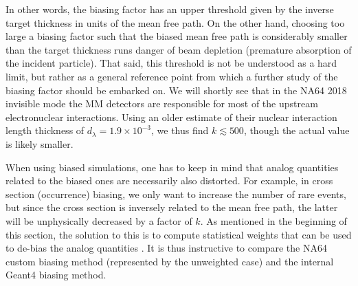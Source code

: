 %
In other words, the biasing factor has an upper threshold given by the inverse target thickness in units of the mean free path. On the other hand, choosing too large a biasing factor such that the biased mean free path is considerably smaller than the target thickness runs danger of beam depletion (premature absorption of the incident particle). That said, this threshold is not be understood as a hard limit, but rather as a general reference point from which a further study of the biasing factor should be embarked on. We will shortly see that in the NA64 2018 invisible mode the MM detectors are responsible for most of the upstream electronuclear interactions. Using an older estimate of their nuclear interaction length thickness of $d_{\lambda} = 1.9 \times 10^{-3}$, we thus find $k \lesssim 500$, though the actual value is likely smaller.

When using biased simulations, one has to keep in mind that analog quantities related to the biased ones are necessarily also distorted. For example, in cross section (occurrence) biasing, we only want to increase the number of rare events, but since the cross section is inversely related to the mean free path, the latter will be unphysically decreased by a factor of $k$. As mentioned in the beginning of this section, the solution to this is to compute statistical weights that can be used to de-bias the analog quantities \cite{G4bias,Mendenhall_2012}. It is thus instructive to compare the NA64 custom biasing method (represented by the unweighted case) and the internal Geant4 biasing method.

